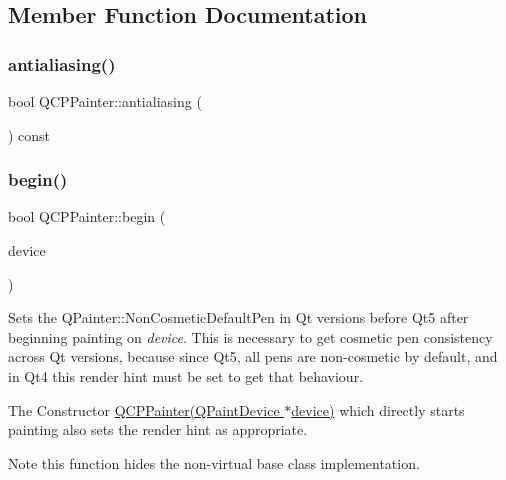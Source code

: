 \subsection{Member Function Documentation}
\mbox{\label{class_q_c_p_painter_a5aff96296e995f6f35b2596a482aae37}} 
\subsubsection{\texorpdfstring{antialiasing()}{antialiasing()}}
{\footnotesize\ttfamily bool Q\+C\+P\+Painter\+::antialiasing (\begin{DoxyParamCaption}{ }\end{DoxyParamCaption}) const\hspace{0.3cm}{\ttfamily [inline]}}

\mbox{\label{class_q_c_p_painter_a0a41146ccd619dceab6e25ec7b46b044}} 
\subsubsection{\texorpdfstring{begin()}{begin()}}
{\footnotesize\ttfamily bool Q\+C\+P\+Painter\+::begin (\begin{DoxyParamCaption}\item[{Q\+Paint\+Device $\ast$}]{device }\end{DoxyParamCaption})}

Sets the Q\+Painter\+::\+Non\+Cosmetic\+Default\+Pen in Qt versions before Qt5 after beginning painting on {\itshape device}. This is necessary to get cosmetic pen consistency across Qt versions, because since Qt5, all pens are non-\/cosmetic by default, and in Qt4 this render hint must be set to get that behaviour.

The Constructor \hyperlink{class_q_c_p_painter_ae58dbb1795ddc4351ab324dc9898aa22}{Q\+C\+P\+Painter(\+Q\+Paint\+Device $\ast$device)} which directly starts painting also sets the render hint as appropriate.

\begin{DoxyNote}{Note}
this function hides the non-\/virtual base class implementation. 
\end{DoxyNote}
\mbox{\label{class_q_c_p_painter_a0b4b1b9bd495e182c731774dc800e6e0}} 
